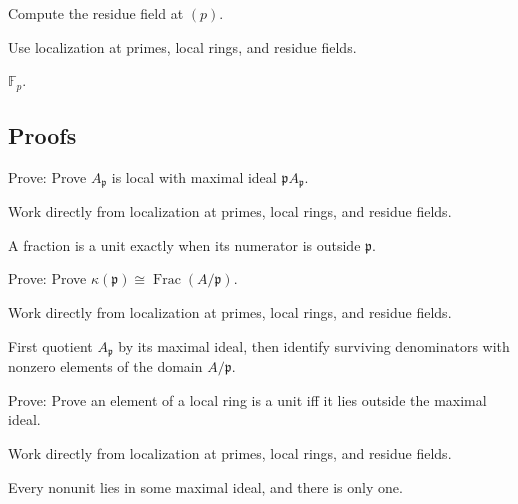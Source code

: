 \begin{exercise}\label{exr:vi11-expand-05}
Compute the residue field at $(p)$.
\end{exercise}
\begin{hint}
Use localization at primes, local rings, and residue fields.
\end{hint}
\begin{solution}
$\mathbb F_p$.
\end{solution}

\subsection*{Proofs}

\begin{exercise}\label{exr:vi11-expand-06}
Prove: Prove $A_{\mathfrak p}$ is local with maximal ideal $\mathfrak pA_{\mathfrak p}$.
\end{exercise}
\begin{hint}
Work directly from localization at primes, local rings, and residue fields.
\end{hint}
\begin{solution}
A fraction is a unit exactly when its numerator is outside $\mathfrak p$.
\end{solution}

\begin{exercise}\label{exr:vi11-expand-07}
Prove: Prove $\kappa(\mathfrak p)\cong\operatorname{Frac}(A/\mathfrak p)$.
\end{exercise}
\begin{hint}
Work directly from localization at primes, local rings, and residue fields.
\end{hint}
\begin{solution}
First quotient $A_{\mathfrak p}$ by its maximal ideal, then identify surviving denominators with nonzero elements of the domain $A/\mathfrak p$.
\end{solution}

\begin{exercise}[Units]\label{exr:vi11-expand-08}
Prove: Prove an element of a local ring is a unit iff it lies outside the maximal ideal.
\end{exercise}
\begin{hint}
Work directly from localization at primes, local rings, and residue fields.
\end{hint}
\begin{solution}
Every nonunit lies in some maximal ideal, and there is only one.
\end{solution}

